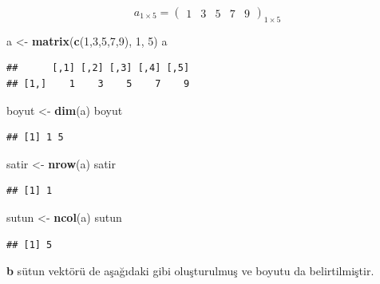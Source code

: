 \documentclass[
]{book}
\newenvironment{Shaded}{\begin{snugshade}}{\end{snugshade}}
\newcommand{\DecValTok}[1]{\textcolor[rgb]{0.00,0.00,0.81}{#1}}
\newcommand{\FunctionTok}[1]{\textcolor[rgb]{0.13,0.29,0.53}{\textbf{#1}}}
\newcommand{\NormalTok}[1]{#1}
\newcommand{\OtherTok}[1]{\textcolor[rgb]{0.56,0.35,0.01}{#1}}
\begin{document}
\[a_{1×5} =
\begin{pmatrix}
 1 & 3 & 5 & 7 & 9
\end{pmatrix}_{1 × 5}\]

\begin{Shaded}
\begin{Highlighting}[]
\NormalTok{ a }\OtherTok{\textless{}{-}} \FunctionTok{matrix}\NormalTok{(}\FunctionTok{c}\NormalTok{(}\DecValTok{1}\NormalTok{,}\DecValTok{3}\NormalTok{,}\DecValTok{5}\NormalTok{,}\DecValTok{7}\NormalTok{,}\DecValTok{9}\NormalTok{), }\DecValTok{1}\NormalTok{, }\DecValTok{5}\NormalTok{) }
\NormalTok{ a }
\end{Highlighting}
\end{Shaded}

\begin{verbatim}
##      [,1] [,2] [,3] [,4] [,5]
## [1,]    1    3    5    7    9
\end{verbatim}

\begin{Shaded}
\begin{Highlighting}[]
\NormalTok{ boyut }\OtherTok{\textless{}{-}} \FunctionTok{dim}\NormalTok{(a)}
\NormalTok{ boyut}
\end{Highlighting}
\end{Shaded}

\begin{verbatim}
## [1] 1 5
\end{verbatim}

\begin{Shaded}
\begin{Highlighting}[]
\NormalTok{ satir }\OtherTok{\textless{}{-}} \FunctionTok{nrow}\NormalTok{(a)}
\NormalTok{ satir}
\end{Highlighting}
\end{Shaded}

\begin{verbatim}
## [1] 1
\end{verbatim}

\begin{Shaded}
\begin{Highlighting}[]
\NormalTok{ sutun }\OtherTok{\textless{}{-}} \FunctionTok{ncol}\NormalTok{(a)}
\NormalTok{ sutun}
\end{Highlighting}
\end{Shaded}

\begin{verbatim}
## [1] 5
\end{verbatim}

\textbf{b} sütun vektörü de aşağıdaki gibi oluşturulmuş ve boyutu da belirtilmiştir.
\end{document}
